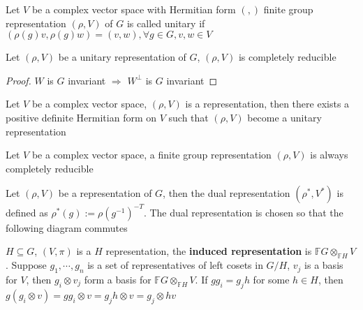 \documentclass[main]{subfiles}
\begin{document}
\begin{definition}
Let $V$ be a complex vector space with Hermitian form $(,)$ finite group representation $(\rho,V)$ of $G$ is called unitary if $(\rho(g)v,\rho(g)w)=(v,w),\forall g\in G,v,w\in V$
\end{definition}

\begin{proposition}
Let $(\rho,V)$ be a unitary representation of $G$, $(\rho,V)$ is completely reducible
\end{proposition}

\begin{proof}
$W$ is $G$ invariant $\Rightarrow$ $W^\perp$ is $G$ invariant
\end{proof}

\begin{proposition}
Let $V$ be a complex vector space, $(\rho,V)$ is a representation, then there exists a positive definite Hermitian form on $V$ such that $(\rho,V)$ become a unitary representation
\end{proposition}

\begin{corollary}
Let $V$ be a complex vector space, a finite group representation $(\rho,V)$ is always completely reducible
\end{corollary}

\begin{definition}
Let $(\rho,V)$ be a representation of $G$, then the dual representation $(\rho^*,V^*)$ is defined as $\rho^*(g):=\rho(g^{-1})^{-T}$. The dual representation is chosen so that the following diagram commutes
\begin{center}
\end{center}
\end{definition}

\begin{definition}
$H\subseteq G$, $(V,\pi)$ is a $H$ representation, the \textbf{induced representation} is $\mathbb FG\otimes_{\mathbb FH}V$. Suppose $g_1,\cdots,g_n$ is a set of representatives of left cosets in $G/H$, $v_j$ is a basis for $V$, then $g_i\otimes v_j$ form a basis for $\mathbb FG\otimes_{\mathbb FH}V$. If $gg_i=g_jh$ for some $h\in H$, then $g(g_i\otimes v)=gg_i\otimes v=g_jh\otimes v=g_j\otimes hv$
\end{definition}
\end{document}
